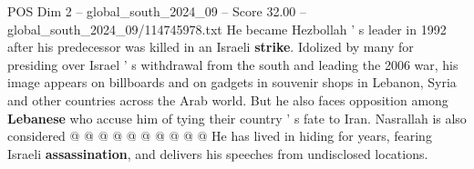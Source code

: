 \begin{textsample}{POS Dim 2 – global\_south\_2024\_09 – Score 32.00 – global\_south\_2024\_09/114745978.txt}
He became Hezbollah ' s leader in 1992 after his predecessor was killed in an Israeli \textbf{strike}.
Idolized by many for presiding over Israel ' s withdrawal from the south and leading the 2006 war, his image appears on billboards and on gadgets in souvenir shops in Lebanon, Syria and other countries across the Arab world.
But he also faces opposition among \textbf{Lebanese} who accuse him of tying their country ' s fate to Iran.
Nasrallah is also considered @ @ @ @ @ @ @ @ @ @ He has lived in hiding for years, fearing Israeli \textbf{assassination}, and delivers his speeches from undisclosed locations.

\end{textsample}
